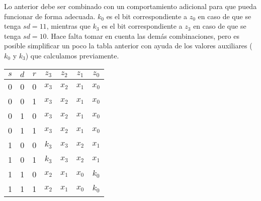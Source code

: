 \documentclass[../procedimientos.tex]{subfiles}
\begin{document}
Lo anterior debe ser combinado con un comportamiento adicional para que pueda 
funcionar de forma adecuada. $k_0$ es el bit correspondiente a $z_0$ en caso 
de que se tenga $sd=11$, mientras que $k_3$ es el bit correspondiente a $z_3$ 
en caso de que se tenga $sd=10$. Hace falta tomar en cuenta las demás 
combinaciones, pero es posible simplificar un poco la tabla anterior con ayuda 
de los valores auxiliares ($k_0$ y $k_3$) que calculamos previamente.
\begin{table}[H]
  \centering
  \begin{tabular}{ccc|cccc}
    $s$ & $d$ & $r$ & $z_3$ & $z_2$ & $z_1$ & $z_0$\\
    \hline
    0 & 0 & 0 & $x_3$ & $x_2$ & $x_1$ & $x_0$\\
    0 & 0 & 1 & $x_3$ & $x_2$ & $x_1$ & $x_0$\\
    0 & 1 & 0 & $x_3$ & $x_2$ & $x_1$ & $x_0$\\
    0 & 1 & 1 & $x_3$ & $x_2$ & $x_1$ & $x_0$\\
    1 & 0 & 0 & $k_3$ & $x_3$ & $x_2$ & $x_1$\\
    1 & 0 & 1 & $k_3$ & $x_3$ & $x_2$ & $x_1$\\
    1 & 1 & 0 & $x_2$ & $x_1$ & $x_0$ & $k_0$\\
    1 & 1 & 1 & $x_2$ & $x_1$ & $x_0$ & $k_0$
  \end{tabular}
\end{table}
\end{document}

